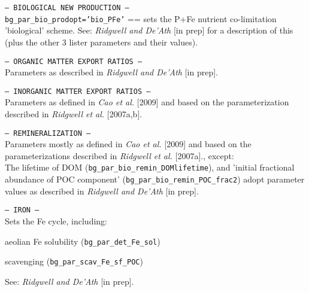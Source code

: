 \documentclass[10pt,twoside]{article}
\begin{document}
\begin{compactitem}
	
	\item \texttt{--- BIOLOGICAL NEW PRODUCTION ---}
	\\ \texttt{bg\_par\_bio\_prodopt='bio\_PFe'} == sets the P+Fe nutrient co-limitation 'biological' scheme. See: \textit{Ridgwell and De'Ath} [in prep] for a description of this (plus the other 3 lister parameters and their values).
	
	\item \texttt{--- ORGANIC MATTER EXPORT RATIOS ---}
	\\ Parameters as described in \textit{Ridgwell and De'Ath} [in prep].
	
	\item \texttt{--- INORGANIC MATTER EXPORT RATIOS ---}
	\\ Parameters as defined in \textit{Cao et al.} [2009] and based on the parameterization described in \textit{Ridgwell et al.} [2007a,b].
	
	\item \texttt{--- REMINERALIZATION ---}
	\\ Parameters mostly as defined in \textit{Cao et al.} [2009] and based on the parameterizations described in \textit{Ridgwell et al.} [2007a]., except:
	\\ The lifetime of DOM (\texttt{bg\_par\_bio\_remin\_DOMlifetime}), and 'initial fractional abundance of POC component' (\texttt{bg\_par\_bio\_remin\_POC\_frac2}) adopt parameter values as described in \textit{Ridgwell and De'Ath} [in prep].	
	
	\item \texttt{--- IRON ---}
	\\ Sets the Fe cycle, including:
	\begin{compactitem}
	\item	aeolian Fe solubility (\texttt{bg\_par\_det\_Fe\_sol})
		\item scavenging (\texttt{bg\_par\_scav\_Fe\_sf\_POC})
		\end{compactitem}
		\noindent See: \textit{Ridgwell and De'Ath} [in prep].
	

\end{compactitem}
\end{document}
